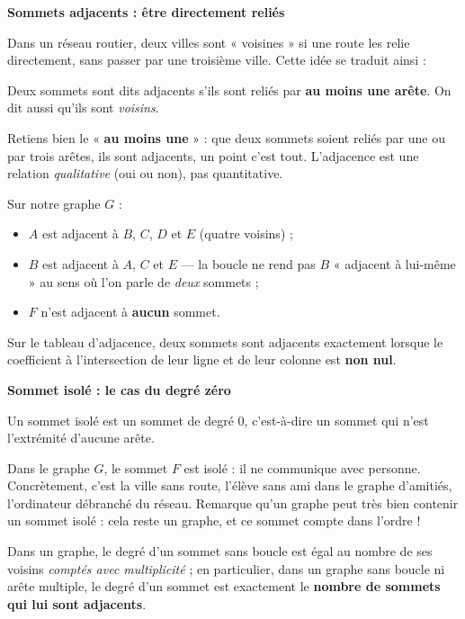 \documentclass[11pt]{article}
\newcommand{\cle}[1]{{\popxbold\color{popdark}#1}}
\begin{document}
\textbf{Sommets adjacents : être directement reliés}\par

Dans un réseau routier, deux villes sont « voisines » si une route les relie directement, sans passer par une troisième ville. Cette idée se traduit ainsi :

\begin{definition}
Deux sommets sont dits \cle{adjacents} s'ils sont reliés par \textbf{au moins une arête}. On dit aussi qu'ils sont \emph{voisins}.
\end{definition}

Retiens bien le « \textbf{au moins une} » : que deux sommets soient reliés par une ou par trois arêtes, ils sont adjacents, un point c'est tout. L'adjacence est une relation \emph{qualitative} (oui ou non), pas quantitative.

Sur notre graphe $G$ :
\begin{itemize}
\item $A$ est adjacent à $B$, $C$, $D$ et $E$ (quatre voisins) ;
\item $B$ est adjacent à $A$, $C$ et $E$ — la boucle ne rend pas $B$ « adjacent à lui-même » au sens où l'on parle de \emph{deux} sommets ;
\item $F$ n'est adjacent à \textbf{aucun} sommet.
\end{itemize}

Sur le tableau d'adjacence, deux sommets sont adjacents exactement lorsque le coefficient à l'intersection de leur ligne et de leur colonne est \textbf{non nul}.

\textbf{Sommet isolé : le cas du degré zéro}\par

\begin{definition}
Un sommet \cle{isolé} est un sommet de degré $0$, c'est-à-dire un sommet qui n'est l'extrémité d'aucune arête.
\end{definition}

Dans le graphe $G$, le sommet $F$ est isolé : il ne communique avec personne. Concrètement, c'est la ville sans route, l'élève sans ami dans le graphe d'amitiés, l'ordinateur débranché du réseau. Remarque qu'un graphe peut très bien contenir un sommet isolé : cela reste un graphe, et ce sommet compte dans l'ordre !

\begin{propriete}
Dans un graphe, le degré d'un sommet sans boucle est égal au nombre de ses voisins \emph{comptés avec multiplicité} ; en particulier, dans un graphe sans boucle ni arête multiple, le degré d'un sommet est exactement le \textbf{nombre de sommets qui lui sont adjacents}.
\end{propriete}
\end{document}

